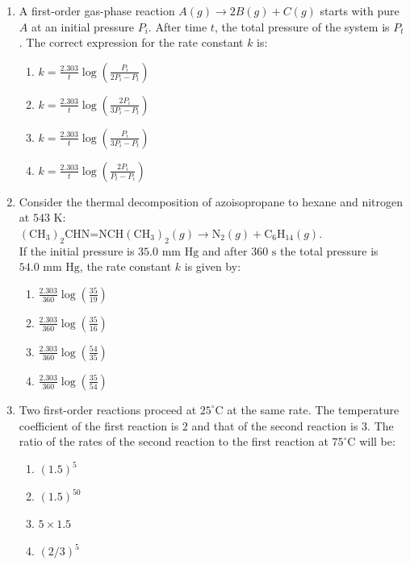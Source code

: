 \documentclass[11pt, a4paper]{article}
\begin{document}
\begin{enumerate}
\item A first-order gas-phase reaction $A(g) \rightarrow 2B(g) + C(g)$ starts with pure $A$ at an initial pressure $P_i$. After time $t$, the total pressure of the system is $P_t$. The correct expression for the rate constant $k$ is:
\begin{enumerate}
    \item $k = \frac{2.303}{t} \log \left( \frac{P_i}{2P_i - P_t} \right)$
    \item $k = \frac{2.303}{t} \log \left( \frac{2P_i}{3P_i - P_t} \right)$
    \item $k = \frac{2.303}{t} \log \left( \frac{P_i}{3P_i - P_t} \right)$
    \item $k = \frac{2.303}{t} \log \left( \frac{2P_i}{P_t - P_i} \right)$
\end{enumerate}

\item Consider the thermal decomposition of azoisopropane to hexane and nitrogen at $543\text{ K}$: \\
$( \text{CH}_3 )_2\text{CHN=NCH}(\text{CH}_3)_2(g) \rightarrow \text{N}_2(g) + \text{C}_6\text{H}_{14}(g)$. \\
If the initial pressure is $35.0\text{ mm Hg}$ and after $360\text{ s}$ the total pressure is $54.0\text{ mm Hg}$, the rate constant $k$ is given by:
\begin{enumerate}
    \item $\frac{2.303}{360} \log \left( \frac{35}{19} \right)$
    \item $\frac{2.303}{360} \log \left( \frac{35}{16} \right)$
    \item $\frac{2.303}{360} \log \left( \frac{54}{35} \right)$
    \item $\frac{2.303}{360} \log \left( \frac{35}{54} \right)$
\end{enumerate}

\item Two first-order reactions proceed at $25^\circ\text{C}$ at the same rate. The temperature coefficient of the first reaction is $2$ and that of the second reaction is $3$. The ratio of the rates of the second reaction to the first reaction at $75^\circ\text{C}$ will be:
\begin{enumerate}
    \item $(1.5)^5$
    \item $(1.5)^{50}$
    \item $5 \times 1.5$
    \item $(2/3)^5$
\end{enumerate}


\end{enumerate}
\end{document}
